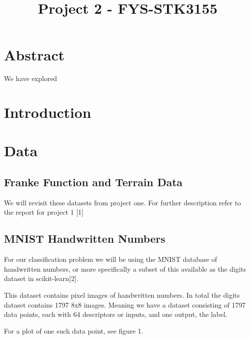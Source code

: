 \documentclass[11pt]{article}
\title{Project 2 - FYS-STK3155}
\begin{document}
    
    \maketitle
    
    

    
    \hypertarget{abstract}{%
\section{Abstract}\label{abstract}}

    We have explored

    \hypertarget{introduction}{%
\section{Introduction}\label{introduction}}

    

    \hypertarget{data}{%
\section{Data}\label{data}}

\hypertarget{franke-function-and-terrain-data}{%
\subsection{Franke Function and Terrain
Data}\label{franke-function-and-terrain-data}}

We will revisit these datasets from project one. For further description
refer to the report for project 1 {[}1{]}

    \hypertarget{mnist-handwritten-numbers}{%
\subsection{MNIST Handwritten Numbers}\label{mnist-handwritten-numbers}}

For our classification problem we will be using the MNIST database of
handwritten numbers, or more specifically a subset of this available as
the digits dataset in scikit-learn{[}2{]}.

This dataset contains pixel images of handwritten numbers. In total the
digits dataset contains 1797 8x8 images. Meaning we have a dataset
consisting of 1797 data points, each with 64 descriptors or inputs, and
one output, the label.

For a plot of one such data point, see figure 1.

    \begin{center}
    \end{center}
    { \hspace*{\fill} \\}
    
\end{document}
